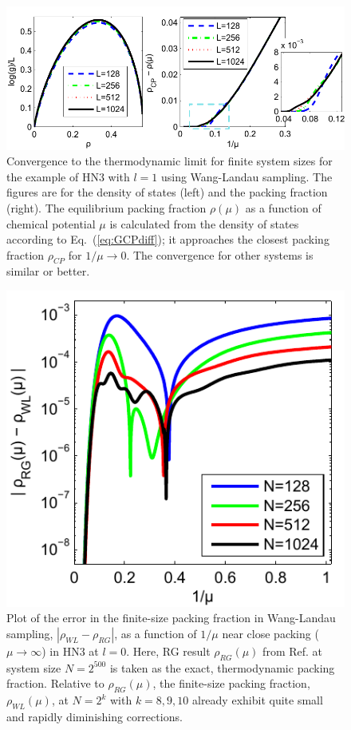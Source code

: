 \begin{figure}
\centering \includegraphics[width=1\columnwidth]{Chapter-2/Paper_ConvergenceHN3_Plot2}
\protect\caption{Convergence to the thermodynamic limit for finite system sizes for
the example of HN3 with $l=1$ using Wang-Landau sampling. The figures are
for the density of states (left) and the packing fraction (right). The
equilibrium packing fraction $\rho(\mu)$ as a function of chemical
potential $\mu$ is calculated from the density of states according
to Eq.~(\ref{eq:GCPdiff}); it approaches the closest packing fraction
$\rho_{CP}$ for $1/\mu\to0$. The convergence for other systems is
similar or better. }
\label{fig:WLconverge} 
\end{figure}


\begin{figure}
\centering\includegraphics[width=0.6\columnwidth]{Chapter-2/Paper_HN3_l0_RGvsWL_error-eps-converted-to}\protect\caption{\label{fig:RGvsWL} 
Plot of the error in the finite-size packing fraction
in Wang-Landau sampling, $\left|\rho_{WL}-\rho_{RG}\right|$, as a
function of $1/\mu$ near close packing ($\mu\to\infty$) in HN3 at
$l=0$. Here, RG result $\rho_{RG}(\mu)$ from Ref. \protect\cite{BoHa11}
at system size $N=2^{500}$ is taken as the exact, thermodynamic packing
fraction. Relative to $\rho_{RG}(\mu)$, the finite-size packing fraction,
$\rho_{WL}(\mu)$, at $N=2^{k}$ with $k=8,9,10$ already exhibit
quite small and rapidly diminishing corrections. }
\end{figure}


